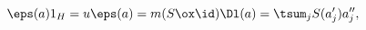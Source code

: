 \begin{equation}
\eps(a) 1_H = u \eps(a) = m(S \ox \id)\Dl(a) = \tsum_j S(a'_j) a''_j,
\label{eq:antipode}%
\end{equation}

